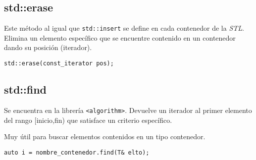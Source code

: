 \subsection{std::erase}
Este método al igual que \texttt{std::insert} se define en cada contenedor de la \textit{STL}.
Elimina un elemento específico que se encuentre contenido en un contenedor dando su posición (iterador).
\begin{center}
	\texttt{std::erase(const\_iterator pos);}
\end{center}

\subsection{std::find}
Se encuentra en la librería \texttt{<algorithm>}.
Devuelve un iterador al primer elemento del rango [inicio,fin) que satisface un criterio específico.

Muy útil para buscar elementos contenidos en un tipo contenedor.
\begin{center}
	\texttt{auto i = nombre\_contenedor.find(T\& elto);}
\end{center}




























